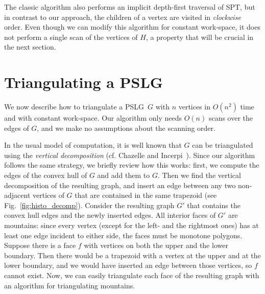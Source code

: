 \documentclass[11pt,a4paper]{article}
\newcommand{\histogram}{mountain}
\newcommand{\pslg}{PSLG}
\newcommand{\Pslg}{PSLG}
\begin{document}
The classic algorithm also performs an implicit depth-first traversal of SPT,
but in contrast to our approach,
the children
of a vertex are visited in \emph{clockwise} order.
Even though we can modify this algorithm for constant work-space,
it does not perform a single scan of the vertices of $H$, a property that
will be crucial in the next section.


\section{Triangulating a \Pslg}
\label{sec:polygon}

We now describe how to triangulate
a \pslg\ $G$ with $n$ vertices in $O(n^2)$
time and with constant work-space.
Our algorithm only needs $O(n)$ scans over the edges of
$G$, and we make no assumptions about the scanning order.

In the usual model of computation, it is well known that $G$ can
be triangulated using the \emph{vertical decomposition}
(cf. Chazelle and Incerpi~\cite{ChazelleIn84}).
Since our algorithm follows the same strategy, we briefly review
how this works: first, we compute
the edges of the convex hull of $G$ and add them to $G$. Then
we find the vertical decomposition of the resulting graph,
and insert an edge between any two non-adjacent vertices of
$G$ that are contained in the same trapezoid
(see Fig.~\ref{fig:histo_decomp}).
Consider the resulting graph $G'$ that contains the convex hull edges
and the newly inserted edges.
All  interior faces of $G'$ are \histogram s:
since every vertex (except for the left- and the rightmost ones)
has at least one edge incident to either side,
the faces must be monotone polygons.
Suppose there is a face $f$ with vertices on both the upper and the lower
boundary. Then there would be
a trapezoid with a vertex at the upper and at the lower
boundary, and we would have inserted an edge between those vertices,
so $f$ cannot exist. Now, we can easily triangulate each face of the
resulting graph with an algorithm for triangulating \histogram s.
\end{document}
